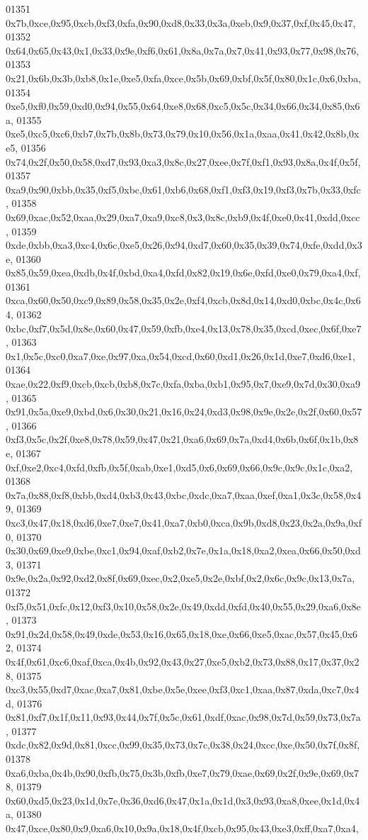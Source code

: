 \begin{DoxyCode}
01351   0x7b,0xce,0x95,0xcb,0xf3,0xfa,0x90,0xd8,0x33,0x3a,0xeb,0x9,0x37,0xf,0x45,0x47,
01352   0x64,0x65,0x43,0x1,0x33,0x9e,0xf6,0x61,0x8a,0x7a,0x7,0x41,0x93,0x77,0x98,0x76,
01353   0x21,0x6b,0x3b,0xb8,0x1e,0xe5,0xfa,0xce,0x5b,0x69,0xbf,0x5f,0x80,0x1c,0x6,0xba,
01354   0xe5,0xf0,0x59,0xd0,0x94,0x55,0x64,0xe8,0x68,0xc5,0x5c,0x34,0x66,0x34,0x85,0x6a,
01355   0xe5,0xc5,0xc6,0xb7,0x7b,0x8b,0x73,0x79,0x10,0x56,0x1a,0xaa,0x41,0x42,0x8b,0xe5,
01356   0x74,0x2f,0x50,0x58,0xd7,0x93,0xa3,0x8c,0x27,0xee,0x7f,0xf1,0x93,0x8a,0x4f,0x5f,
01357   0xa9,0x90,0xbb,0x35,0xf5,0xbc,0x61,0xb6,0x68,0xf1,0xf3,0x19,0xf3,0x7b,0x33,0xfc,
01358   0x69,0xac,0x52,0xaa,0x29,0xa7,0xa9,0xc8,0x3,0x8c,0xb9,0x4f,0xe0,0x41,0xdd,0xcc,
01359   0xde,0xbb,0xa3,0xc4,0x6c,0xe5,0x26,0x94,0xd7,0x60,0x35,0x39,0x74,0xfe,0xdd,0x3e,
01360   0x85,0x59,0xea,0xdb,0x4f,0xbd,0xa4,0xfd,0x82,0x19,0x6e,0xfd,0xe0,0x79,0xa4,0xf,
01361   0xca,0x60,0x50,0xc9,0x89,0x58,0x35,0x2e,0xf4,0xcb,0x8d,0x14,0xd0,0xbc,0x4c,0x64,
01362   0xbc,0xf7,0x5d,0x8e,0x60,0x47,0x59,0xfb,0xe4,0x13,0x78,0x35,0xcd,0xec,0x6f,0xe7,
01363   0x1,0x5c,0xc0,0xa7,0xe,0x97,0xa,0x54,0xcd,0x60,0xd1,0x26,0x1d,0xe7,0xd6,0xe1,
01364   0xae,0x22,0xf9,0xcb,0xcb,0xb8,0x7c,0xfa,0xba,0xb1,0x95,0x7,0xe9,0x7d,0x30,0xa9,
01365   0x91,0x5a,0xe9,0xbd,0x6,0x30,0x21,0x16,0x24,0xd3,0x98,0x9e,0x2e,0x2f,0x60,0x57,
01366   0xf3,0x5c,0x2f,0xe8,0x78,0x59,0x47,0x21,0xa6,0x69,0x7a,0xd4,0x6b,0x6f,0x1b,0x8e,
01367   0xf,0xe2,0xc4,0xfd,0xfb,0x5f,0xab,0xe1,0xd5,0x6,0x69,0x66,0x9c,0x9c,0x1c,0xa2,
01368   0x7a,0x88,0xf8,0xbb,0xd4,0xb3,0x43,0xbc,0xdc,0xa7,0xaa,0xef,0xa1,0x3c,0x58,0x49,
01369   0xc3,0x47,0x18,0xd6,0xe7,0xe7,0x41,0xa7,0xb0,0xca,0x9b,0xd8,0x23,0x2a,0x9a,0xf0,
01370   0x30,0x69,0xe9,0xbe,0xc1,0x94,0xaf,0xb2,0x7e,0x1a,0x18,0xa2,0xea,0x66,0x50,0xd3,
01371   0x9e,0x2a,0x92,0xd2,0x8f,0x69,0xec,0x2,0xe5,0x2e,0xbf,0x2,0x6c,0x9c,0x13,0x7a,
01372   0xf5,0x51,0xfc,0x12,0xf3,0x10,0x58,0x2e,0x49,0xdd,0xfd,0x40,0x55,0x29,0xa6,0x8e,
01373   0x91,0x2d,0x58,0x49,0xde,0x53,0x16,0x65,0x18,0xe,0x66,0xe5,0xac,0x57,0x45,0x62,
01374   0x4f,0x61,0xc6,0xaf,0xca,0x4b,0x92,0x43,0x27,0xe5,0xb2,0x73,0x88,0x17,0x37,0x28,
01375   0xc3,0x55,0xd7,0xac,0xa7,0x81,0xbe,0x5e,0xee,0xf3,0xc1,0xaa,0x87,0xda,0xc7,0x4d,
01376   0x81,0xf7,0x1f,0x11,0x93,0x44,0x7f,0x5c,0x61,0xdf,0xac,0x98,0x7d,0x59,0x73,0x7a,
01377   0xdc,0x82,0x9d,0x81,0xcc,0x99,0x35,0x73,0x7c,0x38,0x24,0xcc,0xe,0x50,0x7f,0x8f,
01378   0xa6,0xba,0x4b,0x90,0xfb,0x75,0x3b,0xfb,0xe7,0x79,0xae,0x69,0x2f,0x9e,0x69,0x78,
01379   0x60,0xd5,0x23,0x1d,0x7e,0x36,0xd6,0x47,0x1a,0x1d,0x3,0x93,0xa8,0xee,0x1d,0x4a,
01380   0x47,0xce,0x80,0x9,0xa6,0x10,0x9a,0x18,0x4f,0xcb,0x95,0x43,0xe3,0xff,0xa7,0xa4,

\end{DoxyCode}
